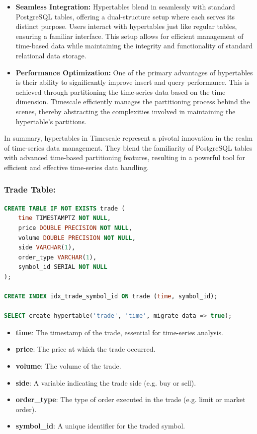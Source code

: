 \begin{itemize}
    \item \textbf{Seamless Integration:} Hypertables blend in seamlessly with standard PostgreSQL tables, offering a dual-structure setup where each serves its distinct purpose. Users interact with hypertables just like regular tables, ensuring a familiar interface. This setup allows for efficient management of time-based data while maintaining the integrity and functionality of standard relational data storage.
    \item \textbf{Performance Optimization:} One of the primary advantages of hypertables is their ability to significantly improve insert and query performance. This is achieved through partitioning the time-series data based on the time dimension. Timescale efficiently manages the partitioning process behind the scenes, thereby abstracting the complexities involved in maintaining the hypertable's partitions.
\end{itemize}

In summary, hypertables in Timescale represent a pivotal innovation in the realm of time-series data management. They blend the familiarity of PostgreSQL tables with advanced time-based partitioning features, resulting in a powerful tool for efficient and effective time-series data handling.

\subsubsection{Trade Table:}
\label{section:trade_table}
\begin{lstlisting}[language=sql, caption=Trade Hypertable, label={lst:trade_hypertable}]
CREATE TABLE IF NOT EXISTS trade (
    time TIMESTAMPTZ NOT NULL,
    price DOUBLE PRECISION NOT NULL,  
    volume DOUBLE PRECISION NOT NULL, 
    side VARCHAR(1),
    order_type VARCHAR(1),
    symbol_id SERIAL NOT NULL
);

CREATE INDEX idx_trade_symbol_id ON trade (time, symbol_id);

SELECT create_hypertable('trade', 'time', migrate_data => true);
\end{lstlisting}

\begin{itemize}
\item \textbf{time}: The timestamp of the trade, essential for time-series analysis.
\item \textbf{price}: The price at which the trade occurred.
\item \textbf{volume}: The volume of the trade.
\item \textbf{side}: A variable indicating the trade side (e.g. buy or sell).
\item \textbf{order\_type}: The type of order executed in the trade (e.g. limit or market order).
\item \textbf{symbol\_id}: A unique identifier for the traded symbol.
\end{itemize}


